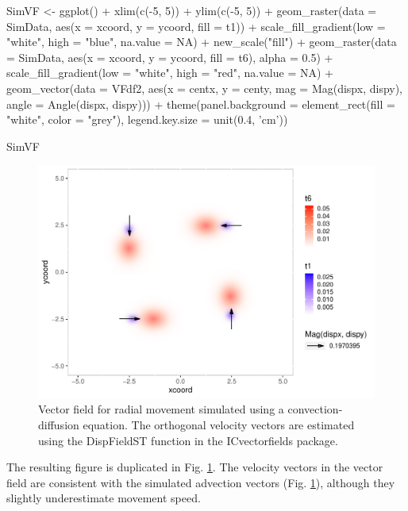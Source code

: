 \begin{Schunk}
\begin{Sinput}
SimVF <- ggplot() +
  xlim(c(-5, 5)) +
  ylim(c(-5, 5)) +
  geom_raster(data = SimData,
              aes(x = xcoord, y = ycoord, fill = t1)) +
  scale_fill_gradient(low = "white", high = "blue", na.value = NA) +
  new_scale("fill") +
  geom_raster(data = SimData,
              aes(x = xcoord, y = ycoord, fill = t6), alpha = 0.5) +
  scale_fill_gradient(low = "white", high = "red", na.value = NA) +
  geom_vector(data = VFdf2, 
              aes(x = centx, y = centy, 
                  mag = Mag(dispx, dispy), 
                  angle = Angle(dispx, dispy))) + 
  theme(panel.background = element_rect(fill = "white", color = "grey"),
        legend.key.size = unit(0.4, 'cm'))

SimVF
\end{Sinput}
\begin{figure}
\includegraphics{ImageCorrelationVFv2_files/figure-latex/3-1} \caption[Vector field for radial movement simulated using a convection-diffusion equation]{Vector field for radial movement simulated using a convection-diffusion equation. The orthogonal velocity vectors are estimated using the DispFieldST function in the ICvectorfields package.}\label{fig:3}
\end{figure}
\end{Schunk}

The resulting figure is duplicated in Fig. \ref{fig:3}. The velocity
vectors in the vector field are consistent with the simulated advection
vectors (Fig. \ref{fig:3}), although they slightly underestimate
movement speed.

